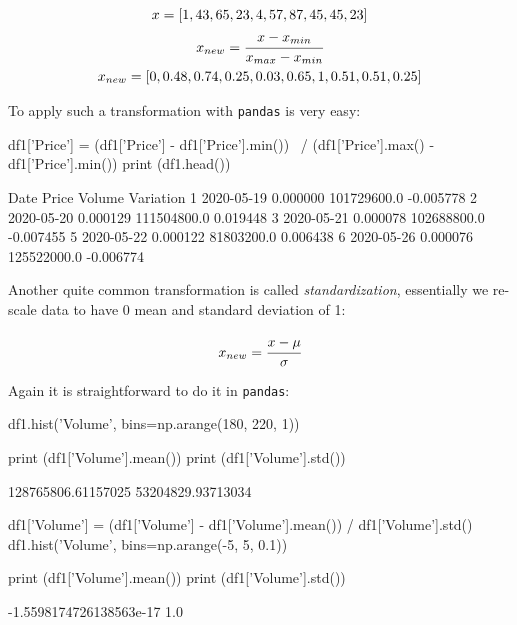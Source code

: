 \begin{equation*}
\begin{gathered}
x = [1,43,65,23,4,57,87,45,45,23]\\
x_{new} = \cfrac{x - x_{min}}{x_{max} - x_{min}}\\
x_{new} = [0,0.48,0.74,0.25,0.03,0.65,1,0.51,0.51,0.25]
\end{gathered}
\end{equation*}

To apply such a transformation with \texttt{pandas} is very easy: 
\begin{ipython}
df1['Price'] = (df1['Price'] - df1['Price'].min()) \
    / (df1['Price'].max() - df1['Price'].min())
print (df1.head())
\end{ipython}
\begin{ioutput}
        Date     Price       Volume  Variation
1 2020-05-19  0.000000  101729600.0  -0.005778
2 2020-05-20  0.000129  111504800.0   0.019448
3 2020-05-21  0.000078  102688800.0  -0.007455
5 2020-05-22  0.000122   81803200.0   0.006438
6 2020-05-26  0.000076  125522000.0  -0.006774
\end{ioutput}
        
Another quite common transformation is called \emph{standardization}, essentially we re-scale data to have 0 mean and standard deviation of 1:

\begin{equation}
x_{new} = \cfrac{x-\mu}{\sigma}
\label{eq:standardization}
\end{equation}

Again it is straightforward to do it in \texttt{pandas}:

\begin{ipython}
df1.hist('Volume', bins=np.arange(180, 220, 1))

print (df1['Volume'].mean())
print (df1['Volume'].std())
\end{ipython}
\begin{ioutput}
128765806.61157025
53204829.93713034
\end{ioutput}

\begin{ipython}
df1['Volume'] = (df1['Volume'] - df1['Volume'].mean()) / df1['Volume'].std()
df1.hist('Volume', bins=np.arange(-5, 5, 0.1))

print (df1['Volume'].mean())
print (df1['Volume'].std())
\end{ipython}
\begin{ioutput}
-1.5598174726138563e-17
1.0
\end{ioutput}

